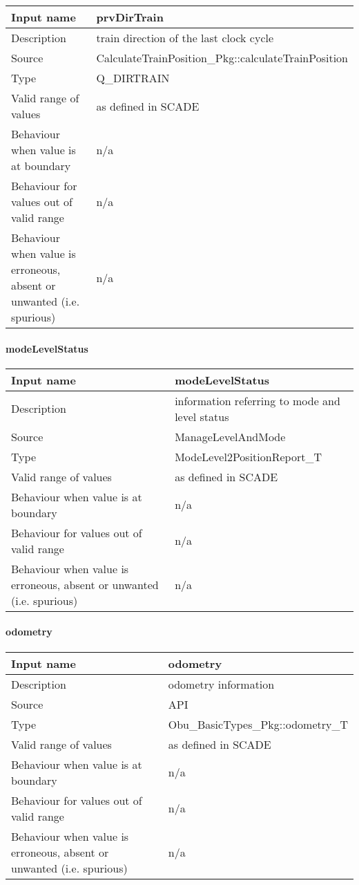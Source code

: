 \begin{longtable}{p{}p{}}
\toprule
Input name				& prvDirTrain \\
\midrule
Description				& train direction of the last clock cycle \\
\midrule
Source					& CalculateTrainPosition\_Pkg::calculateTrainPosition \\ 
\midrule
Type					& Q\_DIRTRAIN \\
\midrule
Valid range of values	& as defined in SCADE \\
\midrule
Behaviour when value is at boundary	& n/a \\
\midrule
Behaviour for values out of valid range	& n/a \\
\midrule
Behaviour when value is erroneous, absent or unwanted (i.e. spurious) & n/a \\
\bottomrule
\end{longtable}

\paragraph{modeLevelStatus}

\begin{longtable}{p{}p{}}
\toprule
Input name				& modeLevelStatus \\
\midrule
Description				& information referring to mode and level status \\
\midrule
Source					& ManageLevelAndMode \\ 
\midrule
Type					& ModeLevel2PositionReport\_T \\
\midrule
Valid range of values	& as defined in SCADE \\
\midrule
Behaviour when value is at boundary	& n/a \\
\midrule
Behaviour for values out of valid range	& n/a \\
\midrule
Behaviour when value is erroneous, absent or unwanted (i.e. spurious) & n/a \\
\bottomrule
\end{longtable}

\paragraph{odometry}

\begin{longtable}{p{}p{}}
\toprule
Input name				& odometry \\
\midrule
Description				& odometry information\\
\midrule
Source					& API \\ 
\midrule
Type					& Obu\_BasicTypes\_Pkg::odometry\_T \\
\midrule
Valid range of values	& as defined in SCADE \\
\midrule
Behaviour when value is at boundary	& n/a \\
\midrule
Behaviour for values out of valid range	& n/a \\
\midrule
Behaviour when value is erroneous, absent or unwanted (i.e. spurious) & n/a \\
\bottomrule
\end{longtable}

